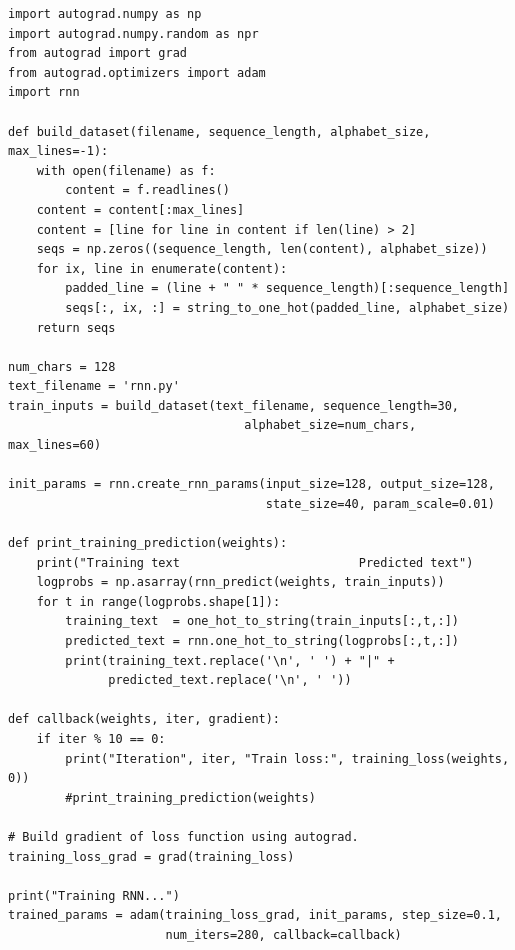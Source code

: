 \documentclass[12pt,fleqn]{article}\usepackage{../../common}
\begin{document}
\begin{verbatim}
import autograd.numpy as np
import autograd.numpy.random as npr
from autograd import grad
from autograd.optimizers import adam
import rnn

def build_dataset(filename, sequence_length, alphabet_size, max_lines=-1):
    with open(filename) as f:
        content = f.readlines()
    content = content[:max_lines]
    content = [line for line in content if len(line) > 2]   
    seqs = np.zeros((sequence_length, len(content), alphabet_size))
    for ix, line in enumerate(content):
        padded_line = (line + " " * sequence_length)[:sequence_length]
        seqs[:, ix, :] = string_to_one_hot(padded_line, alphabet_size)
    return seqs

num_chars = 128
text_filename = 'rnn.py'
train_inputs = build_dataset(text_filename, sequence_length=30,
                                 alphabet_size=num_chars, max_lines=60)

init_params = rnn.create_rnn_params(input_size=128, output_size=128,
                                    state_size=40, param_scale=0.01)
                                    
def print_training_prediction(weights):
    print("Training text                         Predicted text")
    logprobs = np.asarray(rnn_predict(weights, train_inputs))
    for t in range(logprobs.shape[1]):
        training_text  = one_hot_to_string(train_inputs[:,t,:])
        predicted_text = rnn.one_hot_to_string(logprobs[:,t,:])
        print(training_text.replace('\n', ' ') + "|" +
              predicted_text.replace('\n', ' '))

def callback(weights, iter, gradient):
    if iter % 10 == 0:
        print("Iteration", iter, "Train loss:", training_loss(weights, 0))
        #print_training_prediction(weights)

# Build gradient of loss function using autograd.
training_loss_grad = grad(training_loss)

print("Training RNN...")
trained_params = adam(training_loss_grad, init_params, step_size=0.1,
                      num_iters=280, callback=callback)
\end{verbatim}
\end{document}
